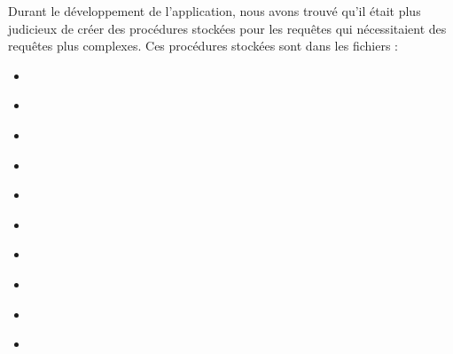 \documentclass{article}
\begin{document}
Durant le développement de l'application, nous avons trouvé qu'il
était plus judicieux de créer des procédures stockées pour les
requêtes qui nécessitaient des requêtes plus complexes. Ces procédures
stockées sont dans les fichiers :
\begin{itemize}
\item
  \href{https://github.com/ZGaillard/projet_session_2935/blob/main/database/DefAddAdresse.sql}{}

\item
  \href{https://github.com/ZGaillard/projet_session_2935/blob/main/database/DefAddArtist.sql}{}

\item
  \href{https://github.com/ZGaillard/projet_session_2935/blob/main/database/DefAddCasting.sql}{}

\item
  \href{https://github.com/ZGaillard/projet_session_2935/blob/main/database/DefAddMovies.sql}{}

\item
  \href{https://github.com/ZGaillard/projet_session_2935/blob/main/database/DefAddPlays.sql}{}

\item
  \href{https://github.com/ZGaillard/projet_session_2935/blob/main/database/DefGetArtistHabit.sql}{}
  
\item
  \href{https://github.com/ZGaillard/projet_session_2935/blob/main/database/DefGetArtistRelations.sql}{}
  
\item
  \href{https://github.com/ZGaillard/projet_session_2935/blob/main/database/DefGetArtistSports.sql}{}
  
\item
  \href{https://github.com/ZGaillard/projet_session_2935/blob/main/database/DefGetArtists.sql}{}
  
\item
  \href{https://github.com/ZGaillard/projet_session_2935/blob/main/database/DefGetCastingArtists.sql}{}
  

\end{itemize}
\end{document}
